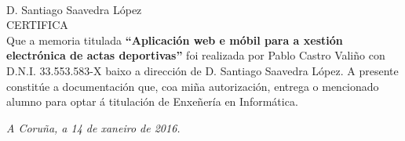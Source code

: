 \thispagestyle{empty}
\mbox{}\\[4cm]
\noindent D. Santiago Saavedra López \\[1cm]
\textsc{CERTIFICA}\\[1.5cm]
\indent Que a memoria titulada \textbf{``Aplicación web e móbil para a xestión 
electrónica de actas deportivas''}
foi realizada por Pablo Castro Valiño con D.N.I. 33.553.583-X baixo a
dirección de D. Santiago Saavedra López. A presente constitúe a
documentación que, coa miña autorización, entrega o mencionado
alumno para optar á titulación de Enxeñería en Informática.
\vfill
\begin{flushright}
\emph{A Coruña, a 14 de xaneiro de 2016.} \\[2cm]
\end{flushright}